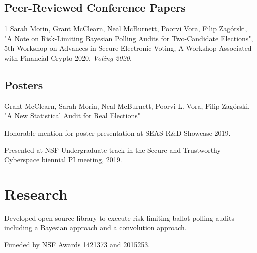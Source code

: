 \documentclass[]{deedy-resume-openfont}
\begin{document}
\begin{minipage}[t]{0.66\textwidth}
        \subsection{Peer-Reviewed Conference Papers}
        \vspace{\topsep}
        \begin{tightemize}
        \item[1] Sarah Morin, Grant McClearn, Neal McBurnett, Poorvi Vora, Filip Zag\'{o}rski, "A Note on Risk-Limiting Bayesian Polling Audits for Two-Candidate Elections", 5th Workshop on Advances in Secure Electronic Voting, A Workshop Associated with Financial Crypto 2020, \textit{Voting 2020}.
        \end{tightemize}
        \sectionsep
        \subsection{Posters}
        Grant McClearn, Sarah Morin, Neal McBurnett, Poorvi L. Vora, Filip Zag\'{o}rski, "A New Statistical Audit for Real Elections"
        \vspace{\topsep}
        \begin{tightemize}
                \item Honorable mention for poster presentation at SEAS R\&D Showcase 2019.\\
                \item Presented at NSF Undergraduate track in the Secure and Trustworthy Cyberspace biennial PI meeting, 2019.
        \end{tightemize}



        \section{Research}
        Developed open source library to execute risk-limiting ballot polling audits including a Bayesian approach and a convolution approach.

        \sectionsep
        Funeded by NSF Awards 1421373 and 2015253.


\end{minipage}
\end{document}
